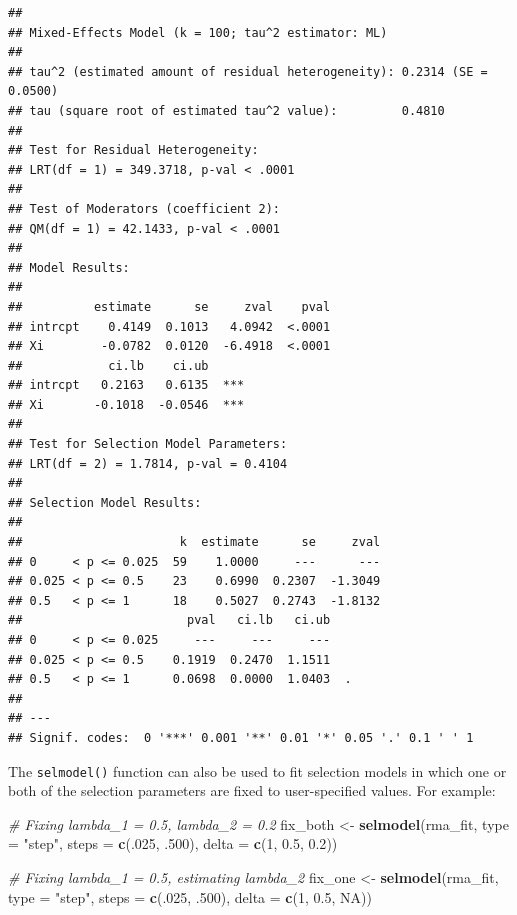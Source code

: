\documentclass[
]{book}
\newenvironment{Shaded}{\begin{snugshade}}{\end{snugshade}}
\newcommand{\AttributeTok}[1]{\textcolor[rgb]{0.13,0.29,0.53}{#1}}
\newcommand{\CommentTok}[1]{\textcolor[rgb]{0.56,0.35,0.01}{\textit{#1}}}
\newcommand{\ConstantTok}[1]{\textcolor[rgb]{0.56,0.35,0.01}{#1}}
\newcommand{\DecValTok}[1]{\textcolor[rgb]{0.00,0.00,0.81}{#1}}
\newcommand{\FloatTok}[1]{\textcolor[rgb]{0.00,0.00,0.81}{#1}}
\newcommand{\FunctionTok}[1]{\textcolor[rgb]{0.13,0.29,0.53}{\textbf{#1}}}
\newcommand{\NormalTok}[1]{#1}
\newcommand{\OtherTok}[1]{\textcolor[rgb]{0.56,0.35,0.01}{#1}}
\newcommand{\StringTok}[1]{\textcolor[rgb]{0.31,0.60,0.02}{#1}}
\begin{document}
\begin{verbatim}
## 
## Mixed-Effects Model (k = 100; tau^2 estimator: ML)
## 
## tau^2 (estimated amount of residual heterogeneity): 0.2314 (SE = 0.0500)
## tau (square root of estimated tau^2 value):         0.4810
## 
## Test for Residual Heterogeneity:
## LRT(df = 1) = 349.3718, p-val < .0001
## 
## Test of Moderators (coefficient 2):
## QM(df = 1) = 42.1433, p-val < .0001
## 
## Model Results:
## 
##          estimate      se     zval    pval 
## intrcpt    0.4149  0.1013   4.0942  <.0001 
## Xi        -0.0782  0.0120  -6.4918  <.0001 
##            ci.lb    ci.ub      
## intrcpt   0.2163   0.6135  *** 
## Xi       -0.1018  -0.0546  *** 
## 
## Test for Selection Model Parameters:
## LRT(df = 2) = 1.7814, p-val = 0.4104
## 
## Selection Model Results:
## 
##                      k  estimate      se     zval 
## 0     < p <= 0.025  59    1.0000     ---      --- 
## 0.025 < p <= 0.5    23    0.6990  0.2307  -1.3049 
## 0.5   < p <= 1      18    0.5027  0.2743  -1.8132 
##                       pval   ci.lb   ci.ub    
## 0     < p <= 0.025     ---     ---     ---    
## 0.025 < p <= 0.5    0.1919  0.2470  1.1511    
## 0.5   < p <= 1      0.0698  0.0000  1.0403  . 
## 
## ---
## Signif. codes:  0 '***' 0.001 '**' 0.01 '*' 0.05 '.' 0.1 ' ' 1
\end{verbatim}

The \texttt{selmodel()} function can also be used to fit selection models in which one or both of the selection parameters are fixed to user-specified values.
For example:

\begin{Shaded}
\begin{Highlighting}[]
\CommentTok{\# Fixing lambda\_1 = 0.5, lambda\_2 = 0.2}
\NormalTok{fix\_both }\OtherTok{\textless{}{-}} \FunctionTok{selmodel}\NormalTok{(rma\_fit, }\AttributeTok{type =} \StringTok{"step"}\NormalTok{, }\AttributeTok{steps =} \FunctionTok{c}\NormalTok{(.}\DecValTok{025}\NormalTok{, .}\DecValTok{500}\NormalTok{), }
                     \AttributeTok{delta =} \FunctionTok{c}\NormalTok{(}\DecValTok{1}\NormalTok{, }\FloatTok{0.5}\NormalTok{, }\FloatTok{0.2}\NormalTok{))}

\CommentTok{\# Fixing lambda\_1 = 0.5, estimating lambda\_2}
\NormalTok{fix\_one }\OtherTok{\textless{}{-}} \FunctionTok{selmodel}\NormalTok{(rma\_fit, }\AttributeTok{type =} \StringTok{"step"}\NormalTok{, }\AttributeTok{steps =} \FunctionTok{c}\NormalTok{(.}\DecValTok{025}\NormalTok{, .}\DecValTok{500}\NormalTok{), }
                    \AttributeTok{delta =} \FunctionTok{c}\NormalTok{(}\DecValTok{1}\NormalTok{, }\FloatTok{0.5}\NormalTok{, }\ConstantTok{NA}\NormalTok{))}
\end{Highlighting}
\end{Shaded}
\end{document}
